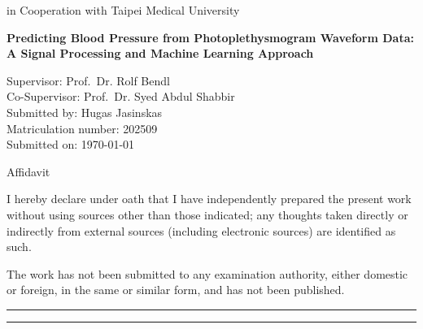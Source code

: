 \documentclass[12pt, bibliography=totoc]{scrartcl}
\begin{document}
\begin{titlepage}
\begin{center}
        \vspace{0.5cm}
        \Large
        in Cooperation with Taipei Medical University
        
        \hrulefill
            
        \vspace{1cm}
        
        \Huge
        \textbf{Predicting Blood Pressure from Photoplethysmogram Waveform Data: A Signal Processing and
Machine Learning Approach}
        
    	\end{center}
    
		\vfill
    		\Large
    		\noindent
    		Supervisor: \tab\hspace{-2cm} Prof.\ Dr. Rolf Bendl\\
    		Co-Supervisor: \tab\hspace{-2cm} Prof.\ Dr. Syed Abdul Shabbir\\
    		Submitted by: \tab\hspace{-2cm} Hugas Jasinskas\\
    		Matriculation number: \tab\hspace{-2cm} 202509\\
    		Submitted on: \tab\hspace{-2cm} \today{}\\
    
\end{titlepage}

\newpage

\begin{Huge}
	\centerline{Affidavit}
\end{Huge}

\vspace{2cm}

\begin{Large}

I hereby declare under oath that I have independently prepared the present work without using sources other than those indicated; any thoughts taken directly or indirectly from external sources (including electronic sources) are identified as such.

The work has not been submitted to any examination authority, either domestic or foreign, in the same or similar form, and has not been published.

\end{Large}

\vfill

\rule{4cm}{0.5mm} \tab \rule{4cm}{0.5mm}
\end{document}
